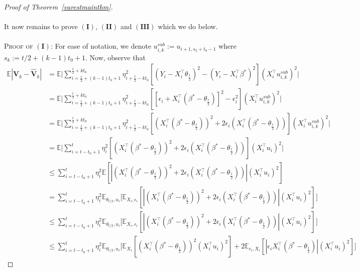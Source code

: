 \documentclass[11pt, reqno,english]{amsart}
\begin{document}
\begin{proof}[Proof of Theorem~\ref{varestmainthm}]
\\\\
It now remains to prove $\mathbf{(I)}$, $\mathbf{(II)}$ and $\mathbf{(III)}$  which we do below.
\\\\
\textsc{Proof of $(\mathbf{I})$:}
For ease of notation, we denote $u^{sub}_{i,k} := u_{i+1, s_k + t_0 - 1}$ where $s_k := t/2 + (k-1)t_0 + 1$. Now, observe that
\begin{align*}
    \mathbb{E}|\mathbf{V}_k - \hat{\mathbf{{V}}}_k| &= \mathbb{E}\bigg|\sum_{i = \frac{t}{2} + (k-1)t_0 + 1}^{\frac{t}{2} + kt_0} \eta^2_{i + \frac{t}{2} - kt_0} [(Y_i - X^\top_i \theta_{\frac{t}{2}})^2 - (Y_i - X^\top_i \beta^*)^2](X^\top_iu^{sub}_{i,k})^2\bigg|
    \\
    &= \mathbb{E}\bigg|\sum_{i = \frac{t}{2} + (k-1)t_0 + 1}^{\frac{t}{2} + kt_0} \eta^2_{i + \frac{t}{2} - kt_0} [[\epsilon_i + X^\top_i (\beta^* - \theta_{\frac{t}{2}})]^2 - \epsilon^2_i](X^\top_iu^{sub}_{i,k})^2\bigg|
    \\
    &= \mathbb{E}\bigg|\sum_{i = \frac{t}{2} + (k-1)t_0 + 1}^{\frac{t}{2} + kt_0} \eta^2_{i + \frac{t}{2} - kt_0} [(X^\top_i(\beta^* - \theta_{\frac{t}{2}}))^2 + 2\epsilon_i (X^\top_i(\beta^* - \theta_{\frac{t}{2}}))](X^\top_iu^{sub}_{i,k})^2\bigg|
    \\
    &= \mathbb{E}\bigg|\sum_{i = t-t_0 + 1}^{t} \eta^2_i [(X^\top_i(\beta^* - \theta_{\frac{t}{2}}))^2 + 2\epsilon_i (X^\top_i(\beta^* - \theta_{\frac{t}{2}}))](X^\top_iu_i)^2\bigg|
    \\
    &\leq \sum_{i = t-t_0 + 1}^t \eta^2_i \mathbb{E}[|(X^\top_i(\beta^* - \theta_{\frac{t}{2}}))^2 + 2\epsilon_i (X^\top_i(\beta^* - \theta_{\frac{t}{2}}))|(X^\top_i u_i)^2]
    \\
    &= \sum_{i = t-t_0 + 1}^t \eta^2_i \mathbb{E}_{\theta_{t/2}, u_i}\bigg[\mathbb{E}_{X_i, \epsilon_i}[|(X^\top_i(\beta^* - \theta_{\frac{t}{2}}))^2 + 2\epsilon_i (X^\top_i(\beta^* - \theta_{\frac{t}{2}}))|(X^\top_i u_i)^2]\bigg]
    \\
    &\leq \sum_{i = t-t_0 + 1}^t \eta^2_i \mathbb{E}_{\theta_{t/2}, u_i}\bigg[\mathbb{E}_{X_i, \epsilon_i}[|(X^\top_i(\beta^* - \theta_{\frac{t}{2}}))^2 + 2\epsilon_i (X^\top_i(\beta^* - \theta_{\frac{t}{2}}))|(X^\top_i u_i)^2]\bigg]
    \\
    &\leq \sum_{i = t-t_0 + 1}^t \eta^2_i \mathbb{E}_{\theta_{t/2}, u_i}\bigg[\mathbb{E}_{X_i}[(X^\top_i(\beta^* - \theta_{\frac{t}{2}}))^2(X^\top_i u_i)^2] + 2\mathbb{E}_{\epsilon_i, X_i}[|\epsilon_i X^\top_i(\beta^* - \theta_{\frac{t}{2}})|(X^\top_iu_i)^2]\bigg]

\end{align*}
\end{proof}
\end{document}
